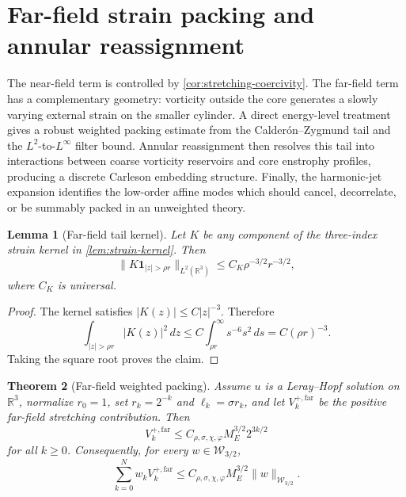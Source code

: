 \documentclass[11pt]{article}
\numberwithin{equation}{section}
\theoremstyle{plain}
\newtheorem{theorem}{Theorem}[section]
\newtheorem{lemma}[theorem]{Lemma}
\theoremstyle{definition}
\theoremstyle{remark}
\newcommand{\R}{\mathbb R}
\begin{document}
\section{Far-field strain packing and annular reassignment}\label{sec:farfield}

The near-field term is controlled by \cref{cor:stretching-coercivity}.  The far-field term has a complementary geometry: vorticity outside the core generates a slowly varying external strain on the smaller cylinder.  A direct energy-level treatment gives a robust weighted packing estimate from the Calder\'on--Zygmund tail and the $L^2$-to-$L^\infty$ filter bound.  Annular reassignment then resolves this tail into interactions between coarse vorticity reservoirs and core enstrophy profiles, producing a discrete Carleson embedding structure.  Finally, the harmonic-jet expansion identifies the low-order affine modes which should cancel, decorrelate, or be summably packed in an unweighted theory.

\begin{lemma}[Far-field tail kernel]\label{lem:tail-kernel}
Let $K$ be any component of the three-index strain kernel in \cref{lem:strain-kernel}.  Then
\begin{equation}\label{eq:tail-kernel}
\|K\mathbf 1_{|z|>\rho r}\|_{L^2(\R^3)}
\le C_K\rho^{-3/2}r^{-3/2},
\end{equation}
where $C_K$ is universal.
\end{lemma}

\begin{proof}
The kernel satisfies $|K(z)|\le C|z|^{-3}$.  Therefore
\[
\int_{|z|>\rho r}|K(z)|^2\,dz
\le
C\int_{\rho r}^{\infty}s^{-6}s^2\,ds
=
C(\rho r)^{-3}.
\]
Taking the square root proves the claim.
\end{proof}

\begin{theorem}[Far-field weighted packing]\label{thm:farfield-packing}
Assume $u$ is a Leray--Hopf solution on $\R^3$, normalize $r_0=1$, set $r_k=2^{-k}$ and $\ell_k=\sigma r_k$, and let $V_k^{+,\mathrm{far}}$ be the positive far-field stretching contribution.  Then
\begin{equation}\label{eq:Ffar-single}
V_k^{+,\mathrm{far}}
\le
C_{\rho,\sigma,\chi,\varphi}M_E^{3/2}2^{3k/2}
\end{equation}
for all $k\ge0$.  Consequently, for every $w\in\mathcal W_{3/2}$,
\begin{equation}\label{eq:Ffar-pack}
\sum_{k=0}^{N}w_kV_k^{+,\mathrm{far}}
\le
C_{\rho,\sigma,\chi,\varphi}M_E^{3/2}
\|w\|_{\mathcal W_{3/2}}.
\end{equation}
\end{theorem}
\end{document}
